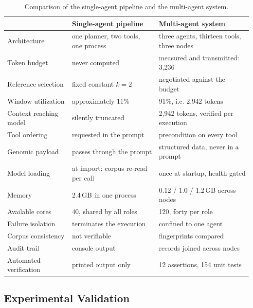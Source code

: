 \begin{table}[H]
\centering
\small
\begin{tabular}{p{3.7cm}p{4.4cm}p{5.0cm}}
\toprule
& \textbf{Single-agent pipeline} & \textbf{Multi-agent system} \\
\midrule
Architecture           & one planner, two tools, one process & three agents, thirteen tools, three nodes \\
Token budget           & never computed                & measured and transmitted: 3{,}236 \\
Reference selection    & fixed constant $k=2$          & negotiated against the budget \\
Window utilization     & approximately 11\%            & 91\%, i.e. 2{,}942 tokens \\
Context reaching model & silently truncated            & 2{,}942 tokens, verified per execution \\
Tool ordering          & requested in the prompt       & precondition on every tool \\
Genomic payload        & passes through the prompt     & structured data, never in a prompt \\
Model loading          & at import; corpus re-read per call & once at startup, health-gated \\
Memory                 & 2.4\,GB in one process        & 0.12 / 1.0 / 1.2\,GB across nodes \\
Available cores        & 40, shared by all roles       & 120, forty per role \\
Failure isolation      & terminates the execution      & confined to one agent \\
Corpus consistency     & not verifiable                & fingerprints compared \\
Audit trail            & console output                & records joined across nodes \\
Automated verification & printed output only           & 12 assertions, 154 unit tests \\
\bottomrule
\end{tabular}
\caption{Comparison of the single-agent pipeline and the multi-agent system.}
\label{tab:comparison}
\end{table}

\subsection{Experimental Validation}

